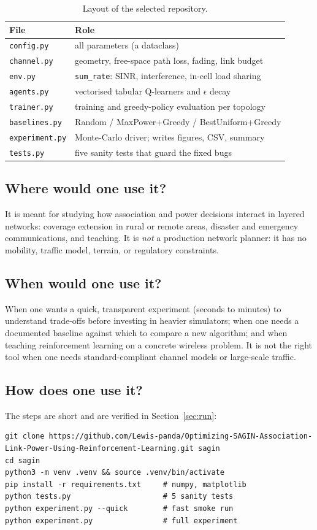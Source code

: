 \documentclass[11pt,a4paper]{article}
\begin{document}
\begin{table}[h]
\centering\small
\begin{tabular}{ll}
\toprule
\textbf{File} & \textbf{Role}\\
\midrule
\texttt{config.py} & all parameters (a dataclass) \\
\texttt{channel.py} & geometry, free-space path loss, fading, link budget \\
\texttt{env.py} & \texttt{sum\_rate}: SINR, interference, in-cell load sharing \\
\texttt{agents.py} & vectorised tabular Q-learners and $\epsilon$ decay \\
\texttt{trainer.py} & training and greedy-policy evaluation per topology \\
\texttt{baselines.py} & Random / MaxPower+Greedy / BestUniform+Greedy \\
\texttt{experiment.py} & Monte-Carlo driver; writes figures, CSV, summary \\
\texttt{tests.py} & five sanity tests that guard the fixed bugs \\
\bottomrule
\end{tabular}
\caption{Layout of the selected repository.}
\label{tab:layout}
\end{table}

\subsection{Where would one use it?}
It is meant for studying how association and power decisions interact in layered networks: coverage extension in rural or remote areas, disaster and emergency communications, and teaching. It is \emph{not} a production network planner: it has no mobility, traffic model, terrain, or regulatory constraints.

\subsection{When would one use it?}
When one wants a quick, transparent experiment (seconds to minutes) to understand trade-offs before investing in heavier simulators; when one needs a documented baseline against which to compare a new algorithm; and when teaching reinforcement learning on a concrete wireless problem. It is not the right tool when one needs standard-compliant channel models or large-scale traffic.

\subsection{How does one use it?}
The steps are short and are verified in Section~\ref{sec:run}:
\begin{lstlisting}
git clone https://github.com/Lewis-panda/Optimizing-SAGIN-Association-Link-Power-Using-Reinforcement-Learning.git sagin
cd sagin
python3 -m venv .venv && source .venv/bin/activate
pip install -r requirements.txt     # numpy, matplotlib
python tests.py                     # 5 sanity tests
python experiment.py --quick        # fast smoke run
python experiment.py                # full experiment
\end{lstlisting}
\end{document}
